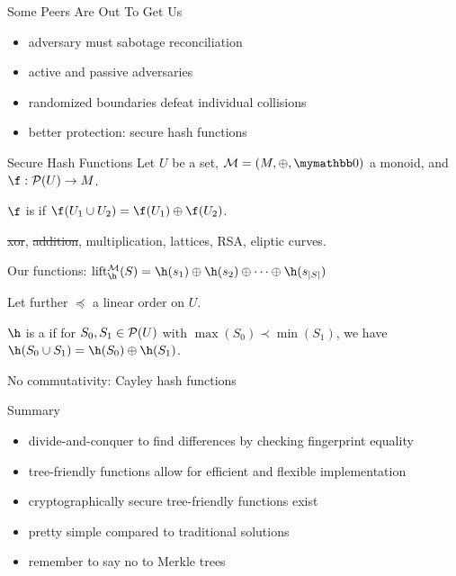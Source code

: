 \documentclass{beamer}
\begin{document}
\begin{frame}{Some Peers Are Out To Get Us}
    \begin{itemize}
        \item adversary must sabotage reconciliation
        \item<2-> active and passive adversaries
        \item<3-> randomized boundaries defeat individual collisions 
        \item<4-> better protection: secure hash functions
    \end{itemize}
\end{frame}

\begin{frame}{Secure Hash Functions}
    Let $U$ be a set, $\mathcal{M} = (M, \groupaddsym, \neutraladd)$ a monoid, and $\fun{\f}{\powerset{U}}{M}$.

    $\f$ is  if $\f(U_1 \cup U_2) = \f(U_1) \groupaddsym \f(U_2)$.\pause

    \sout{xor}, \sout{addition}, multiplication, lattices, RSA, eliptic curves.\pause

    Our functions: $\lift{\h}{\mathcal{M}}(S) = \groupadd{\h(s_1)}{\groupadd{\h(s_2)}{\groupadd{\cdots}{\h(s_{\abs{S}})}}}$\pause

    \vfill

    Let further $\preceq$ a linear order on $U$.
	
	$\h$ is a  if for $S_0, S_1 \in \mathcal{P}({U})$ with $\max(S_0) \prec \min(S_1)$, we have $\h(S_0 \cup S_1) = \groupadd{\h(S_0)}{\h(S_1)}$.

    \vfill

    \pause{}No commutativity: Cayley hash functions
\end{frame}

\begin{frame}{Summary}
    \begin{itemize}
        \item divide-and-conquer to find differences by checking fingerprint equality
        \item tree-friendly functions allow for efficient and flexible implementation
        \item cryptographically secure tree-friendly functions exist
        \item pretty simple compared to traditional solutions\pause
        \item remember to say no to Merkle trees
    \end{itemize}
\end{frame}
\end{document}
